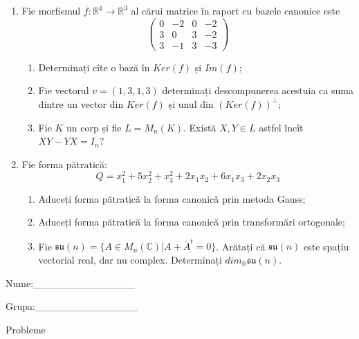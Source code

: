 \documentclass{article}
\begin{document}
\begin{enumerate}
 \item Fie morfismul $f:\mathbb{R}^4 \to \mathbb{R}^3$ al cărui matrice în raport cu bazele canonice este
$$\begin{pmatrix}
0&-2&0&-2\\
3&0&3&-2\\
3&-1&3&-3
\end{pmatrix}$$

\begin{enumerate}
\item Determinați cîte o bază în $Ker(f)$ și $Im(f)$;
\item Fie vectorul $v=(1,3,1,3)$ determinați descompunerea acestuia ca suma dintre un vector din $Ker(f)$ și unul din $(Ker(f))^\perp$;
\item Fie $K$ un corp și fie $L=M_n(K)$. Există $X,Y \in L$ astfel încît $XY-YX=I_n$?  
\end{enumerate}
\item Fie forma pătratică:
$$Q= x_1^2+5x_2^2+x_3^2+2x_1x_2+6x_1x_3+2x_2x_3$$

\begin{enumerate}
\item Aduceți forma pătratică la forma canonică prin metoda Gauss;
\item Aduceți forma pătratică la forma canonică prin transformări ortogonale;
\item Fie $\mathfrak{su}(n)=\{ A \in M_n(\mathbb{C}) | A+\bar{A}^t=0\}$. Arătați că $\mathfrak{su}(n)$ este spațiu vectorial real, dar nu complex.
Determinați $dim_{\mathbb{R}}\mathfrak{su}(n)$.
\end{enumerate}
\end{enumerate}
\newpage
\begin{flushright}
Nume:\_\_\_\_\_\_\_\_\_\_\_\_\_\_
 
 
Grupa:\_\_\_\_\_\_\_\_\_\_\_\_\_\_
\end{flushright}
\begin{center}
\vspace{2cm}
{\Large Probleme}
\vspace{2cm}
\end{center}
\end{document}
